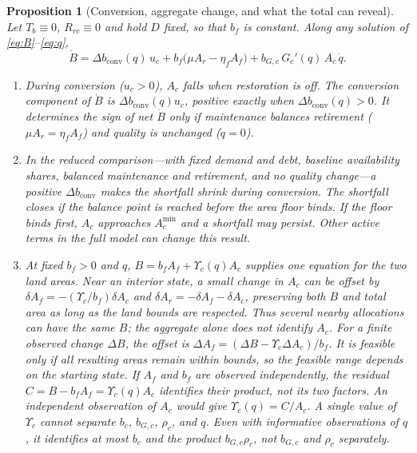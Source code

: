 \documentclass[preprint,12pt,authoryear]{elsarticle}
\newtheorem{proposition}{Proposition}
\newcommand{\dconv}{\Delta b_{\mathrm{conv}}}
\newcommand{\Ups}{\Upsilon_c}
\newcommand{\Acmin}{A_c^{\min}}
\begin{document}
\begin{proposition}[Conversion, aggregate change, and what the total can reveal]\label{prop:mask}
Let $T_b\equiv0$, $R_{rc}\equiv0$ and hold $D$ fixed, so that $b_f$ is constant. Along any solution of \eqref{eq:B}--\eqref{eq:q},
\begin{equation}\label{eq:identity}
\dot B=\dconv(q)\,u_c+b_f\big(\mu A_r-\eta_f A_f\big)+b_{G,c}\,G_c'(q)\,A_c\,\dot q .
\end{equation}
\begin{enumerate}[label=(\roman*)]
\item During conversion ($u_c>0$), $A_c$ falls when restoration is off. The conversion component of $\dot B$ is $\dconv(q)u_c$, positive exactly when $\dconv(q)>0$. It determines the sign of net $\dot B$ only if maintenance balances retirement ($\mu A_r=\eta_fA_f$) and quality is unchanged ($\dot q=0$).
\item In the reduced comparison—with fixed demand and debt, baseline availability shares, balanced maintenance and retirement, and no quality change—a positive $\dconv$ makes the shortfall shrink during conversion. The shortfall closes if the balance point is reached before the area floor binds. If the floor binds first, $A_c$ approaches $\Acmin$ and a shortfall may persist. Other active terms in the full model can change this result.
\item At fixed $b_f>0$ and $q$, $B=b_fA_f+\Ups(q)A_c$ supplies one equation for the two land areas. Near an interior state, a small change in $A_c$ can be offset by $\delta A_f=-(\Ups/b_f)\delta A_c$ and $\delta A_r=-\delta A_f-\delta A_c$, preserving both $B$ and total area as long as the land bounds are respected. Thus several nearby allocations can have the same $B$; the aggregate alone does not identify $A_c$. For a finite observed change $\Delta B$, the offset is $\Delta A_f=(\Delta B-\Ups\Delta A_c)/b_f$. It is feasible only if all resulting areas remain within bounds, so the feasible range depends on the starting state. If $A_f$ and $b_f$ are observed independently, the residual $C=B-b_fA_f=\Ups(q)A_c$ identifies their product, not its two factors. An independent observation of $A_c$ would give $\Ups(q)=C/A_c$. A single value of $\Ups$ cannot separate $b_c$, $b_{G,c}$, $\rho_c$, and $q$. Even with informative observations of $q$, it identifies at most $b_c$ and the product $b_{G,c}\rho_c$, not $b_{G,c}$ and $\rho_c$ separately.
\end{enumerate}
\end{proposition}
\end{document}
